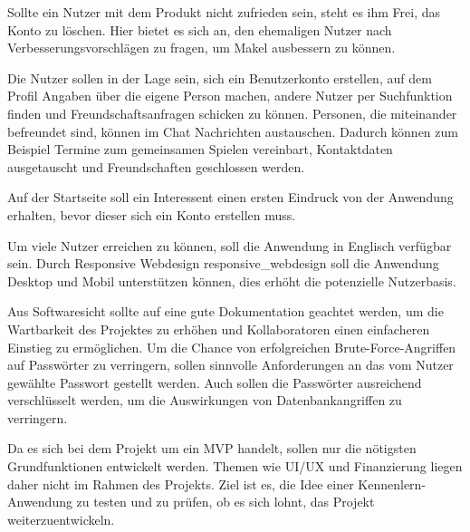 Sollte ein Nutzer mit dem Produkt nicht zufrieden sein, steht es ihm Frei, das Konto zu löschen.
Hier bietet es sich an, den ehemaligen Nutzer nach Verbesserungsvorschlägen zu fragen, um Makel ausbessern zu können.

Die Nutzer sollen in der Lage sein, sich ein Benutzerkonto erstellen, auf dem Profil Angaben über die eigene Person machen, andere Nutzer per Suchfunktion finden und Freundschaftsanfragen schicken zu können.
Personen, die miteinander befreundet sind, können im Chat Nachrichten austauschen.
Dadurch können zum Beispiel Termine zum gemeinsamen Spielen vereinbart, Kontaktdaten ausgetauscht und Freundschaften geschlossen werden.

Auf der Startseite soll ein Interessent einen ersten Eindruck von der Anwendung erhalten, bevor dieser sich ein Konto erstellen muss.

Um viele Nutzer erreichen zu können, soll die Anwendung in Englisch verfügbar sein.
Durch Responsive Webdesign \gls{responsive_webdesign}
soll die Anwendung Desktop und Mobil unterstützen können, dies erhöht die potenzielle Nutzerbasis.

Aus Softwaresicht sollte auf eine gute Dokumentation geachtet werden, um die Wartbarkeit des Projektes zu erhöhen und Kollaboratoren einen einfacheren Einstieg zu ermöglichen.
Um die Chance von erfolgreichen Brute-Force-Angriffen auf Passwörter zu verringern, sollen sinnvolle Anforderungen an das vom Nutzer gewählte Passwort gestellt werden.
Auch sollen die Passwörter ausreichend verschlüsselt werden, um die Auswirkungen von Datenbankangriffen zu verringern.

Da es sich bei dem Projekt um ein MVP handelt, sollen nur die nötigsten Grundfunktionen entwickelt werden.
Themen wie UI/UX und Finanzierung liegen daher nicht im Rahmen des Projekts.
Ziel ist es, die Idee einer Kennenlern-Anwendung zu testen und zu prüfen, ob es sich lohnt, das Projekt weiterzuentwickeln. 